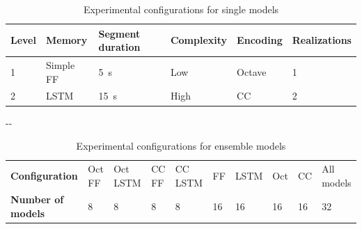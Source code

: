 \begin{table}[tb]
    \centering
    \small
    \caption[Experimental configurations for single models]{Experimental configurations for single models}
    \label{tab:sleep-stages:paper-iii:table-s08a}
    \begin{tabular}{@{}llllll@{}} \toprule
        \textbf{Level} & \textbf{Memory} & \textbf{Segment duration} & \textbf{Complexity} & \textbf{Encoding} & \textbf{Realizations} \\ \midrule
        1 & Simple \acs{FF} & \SI{5}{\second} & Low & Octave & 1 \\
        2 & \acs{LSTM} & \SI{15}{\second} & High & \acs{CC} & 2 \\ \bottomrule
    \end{tabular}
\end{table}

\begin{table}[tb]
\begin{adjustwidth*}{}{-\marginparwidth-\marginparsep}
    \small
    \caption[Experimental configurations for ensemble models]{Experimental configurations for ensemble models}
    \label{tab:sleep-stages:paper-iii:table-s08b}
    \begin{tabular}{@{}llllllllll@{}} \toprule
        \textbf{Configuration} & Oct FF & Oct \ac{LSTM} & \ac{CC} FF & \ac{CC} \ac{LSTM} & FF & \ac{LSTM} & Oct & \ac{CC} & All models \\
        \textbf{Number of models} & 8 & 8 & 8 & 8 & 16 & 16 & 16 & 16 & 32 \\ \bottomrule
    \end{tabular}
\end{adjustwidth*}
\end{table}

